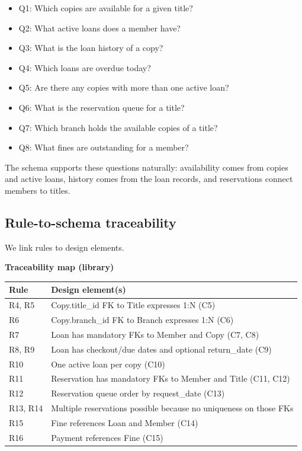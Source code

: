 \begin{itemize}
  \item Q1: Which copies are available for a given title?
  \item Q2: What active loans does a member have?
  \item Q3: What is the loan history of a copy?
  \item Q4: Which loans are overdue today?
  \item Q5: Are there any copies with more than one active loan?
  \item Q6: What is the reservation queue for a title?
  \item Q7: Which branch holds the available copies of a title?
  \item Q8: What fines are outstanding for a member?
\end{itemize}

The schema supports these questions naturally:
availability comes from copies and active loans,
history comes from the loan records,
and reservations connect members to titles.

\subsection{Rule-to-schema traceability}
We link rules to design elements.

\begin{examplebox}
\textbf{Traceability map (library)}\\[4pt]
\begin{tabularx}{\textwidth}{@{}lX@{}}
\toprule
Rule & Design element(s) \\
\midrule
R4, R5 & Copy.title\_id FK to Title expresses 1:N (C5) \\
R6 & Copy.branch\_id FK to Branch expresses 1:N (C6) \\
R7 & Loan has mandatory FKs to Member and Copy (C7, C8) \\
R8, R9 & Loan has checkout/due dates and optional return\_date (C9) \\
R10 & One active loan per copy (C10) \\
R11 & Reservation has mandatory FKs to Member and Title (C11, C12) \\
R12 & Reservation queue order by request\_date (C13) \\
R13, R14 & Multiple reservations possible because no uniqueness on those FKs \\
R15 & Fine references Loan and Member (C14) \\
R16 & Payment references Fine (C15) \\
\bottomrule
\end{tabularx}
\end{examplebox}

